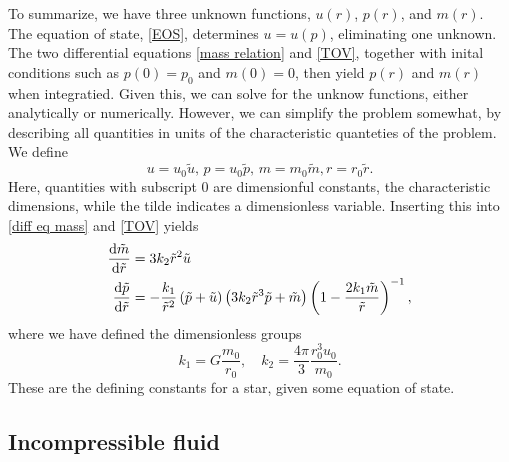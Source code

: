 To summarize, we have three unknown functions, $u(r)$, $p(r)$, and $m(r)$.
The equation of state, \autoref{EOS}, determines $u = u(p)$, eliminating one unknown.
The two differential equations \autoref{mass relation} and \autoref{TOV}, together with inital conditions such as $p(0) = p_0$ and $m(0) = 0$, then yield $p(r)$ and $m(r)$ when integratied.
Given this, we can solve for the unknow functions, either analytically or numerically.
However, we can simplify the problem somewhat, by describing all quantities in units of the characteristic quanteties of the problem.
We define
%
\begin{equation}
    u = u_0 \tilde u, \, p = u_0 \tilde p, \, m =  m_0 \tilde m, r = r_0 \tilde r.
\end{equation}
%
Here, quantities with subscript $0$ are dimensionful constants, the characteristic dimensions, while the tilde indicates a dimensionless variable.
Inserting this into \autoref{diff eq mass} and \autoref{TOV} yields
%
\begin{align}
    \label{mass relation dimensionless}
    \diff{ \tilde m}{\tilde r} & = 3 k_2 \tilde r^2 \tilde u \\
    \label{TOV dimensionless}
    \diff{\tilde p}{\tilde r} & 
    = - \frac{k_1}{\tilde r^2} \left(\tilde p + \tilde u\right) \left(3 k_2 \tilde r^3 \tilde p + \tilde m\right) 
    \left(1 - \frac{2 k_1  \tilde m}{\tilde r}\right)^{-1},
\end{align}
%
where we have defined the dimensionless groups
%
\begin{equation}
    \label{dimensionless groups}
    k_1 = G \frac{m_0}{r_0}, \quad k_2 =  \frac{4 \pi}{3} \frac{r_0^3 u_0}{m_0}.
\end{equation}
%
These are the defining constants for a star, given some equation of state.  



\subsection*{Incompressible fluid}

